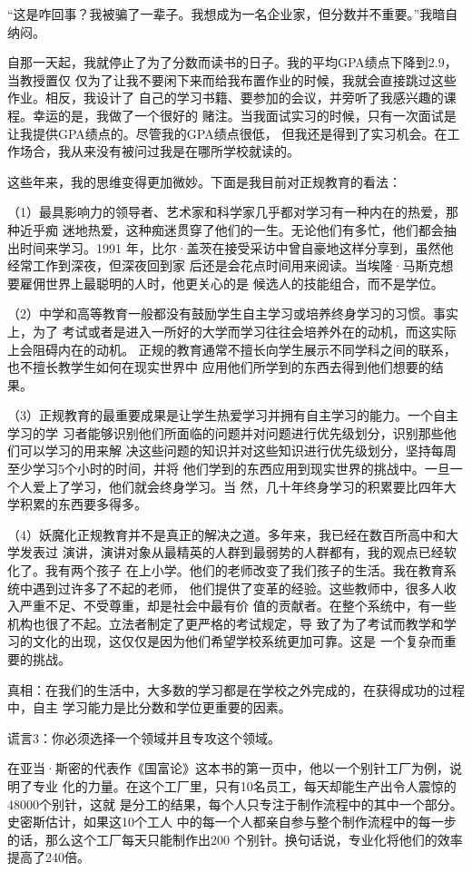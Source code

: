 \documentclass[11pt]{ctexart}
\begin{document}
{{{{“这是咋回事？我被骗了一辈子。我想成为一名企业家，但分数并不重要。”我暗自纳闷。

自那一天起，我就停止了为了分数而读书的日子。我的平均GPA绩点下降到2.9，当教授置仅
仅为了让我不要闲下来而给我布置作业的时候，我就会直接跳过这些作业。相反，我设计了
自己的学习书籍、要参加的会议，并旁听了我感兴趣的课程。幸运的是，我做了一个很好的
赌注。当我面试实习的时候，只有一次面试是让我提供GPA绩点的。尽管我的GPA绩点很低，
但我还是得到了实习机会。在工作场合，我从来没有被问过我是在哪所学校就读的。

这些年来，我的思维变得更加微妙。下面是我目前对正规教育的看法：

（1）最具影响力的领导者、艺术家和科学家几乎都对学习有一种内在的热爱，那种近乎痴
迷地热爱，这种痴迷贯穿了他们的一生。无论他们有多忙，他们都会抽出时间来学习。1991
年，比尔·盖茨在接受采访中曾自豪地这样分享到，虽然他经常工作到深夜，但深夜回到家
后还是会花点时间用来阅读。当埃隆·马斯克想要雇佣世界上最聪明的人时，他更关心的是
候选人的技能组合，而不是学位。

（2）中学和高等教育一般都没有鼓励学生自主学习或培养终身学习的习惯。事实上，为了
考试或者是进入一所好的大学而学习往往会培养外在的动机，而这实际上会阻碍内在的动机。
正规的教育通常不擅长向学生展示不同学科之间的联系，也不擅长教学生如何在现实世界中
应用他们所学到的东西去得到他们想要的结果。

（3）正规教育的最重要成果是让学生热爱学习并拥有自主学习的能力。一个自主学习的学
习者能够识别他们所面临的问题并对问题进行优先级划分，识别那些他们可以学习的用来解
决这些问题的知识并对这些知识进行优先级划分，坚持每周至少学习5个小时的时间，并将
他们学到的东西应用到现实世界的挑战中。一旦一个人爱上了学习，他们就会终身学习。当
然，几十年终身学习的积累要比四年大学积累的东西要多得多。

（4）妖魔化正规教育并不是真正的解决之道。多年来，我已经在数百所高中和大学发表过
演讲，演讲对象从最精英的人群到最弱势的人群都有，我的观点已经软化了。我有两个孩子
在上小学。他们的老师改变了我们孩子的生活。我在教育系统中遇到过许多了不起的老师，
他们提供了变革的经验。这些教师中，很多人收入严重不足、不受尊重，却是社会中最有价
值的贡献者。在整个系统中，有一些机构也很了不起。立法者制定了更严格的考试规定，导
致了为了考试而教学和学习的文化的出现，这仅仅是因为他们希望学校系统更加可靠。这是
一个复杂而重要的挑战。

真相：在我们的生活中，大多数的学习都是在学校之外完成的，在获得成功的过程中，自主
学习能力是比分数和学位更重要的因素。

谎言3：你必须选择一个领域并且专攻这个领域。

在亚当·斯密的代表作《国富论》这本书的第一页中，他以一个别针工厂为例，说明了专业
化的力量。在这个工厂里，只有10名员工，每天却能生产出令人震惊的48000个别针，这就
是分工的结果，每个人只专注于制作流程中的其中一个部分。史密斯估计，如果这10个工人
中的每一个人都亲自参与整个制作流程中的每一步的话，那么这个工厂每天只能制作出200
个别针。换句话说，专业化将他们的效率提高了240倍。

}}}}
\end{document}
